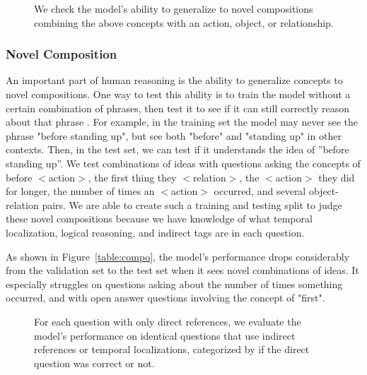 \documentclass[10pt,twocolumn,letterpaper]{article}
\begin{document}
\begin{figure}[t]
\begin{center}
\resizebox{\linewidth}{!}{

}
\end{center}
   \caption{We check the model's ability to generalize to novel compositions combining the above concepts with an action, object, or relationship.}
\label{table:novel}
\end{figure}


\subsubsection{Novel Composition}

An important part of human reasoning is the ability to generalize concepts to novel compositions. One way to test this ability  is to train the model without a certain combination of phrases, then test it to see if it can still correctly reason about that phrase \cite{lake2018generalization}. For example, in the training set the model may never see the phrase "before standing up", but see both "before" and "standing up" in other contexts. Then, in the test set, we can test if it understands the  idea  of  ”before standing up”. We test combinations of ideas with questions asking the concepts of before $<$action$>$, the first thing they $<$relation$>$, the $<$action$>$ they did for longer, the number of times an $<$action$>$ occurred, and several object-relation pairs. We are able to create such a training and testing split to judge these novel  compositions  because  we  have  knowledge  of what temporal localization, logical reasoning, and indirect tags are in each question.

As shown in Figure~\ref{table:compo}, the model's performance drops considerably from the validation set to the test set when it sees novel combinations of ideas. It especially struggles on questions asking about the number of times something occurred, and with open answer questions involving the concept of "first". 


\begin{figure}[t]
\begin{center}
\resizebox{\linewidth}{!}{

}
\end{center}
   \caption{For each question with only direct references, we evaluate the model's performance on identical questions that use indirect references or temporal localizations, categorized by if the direct question was correct or not.}
\label{table:novel}
\end{figure}
\end{document}
